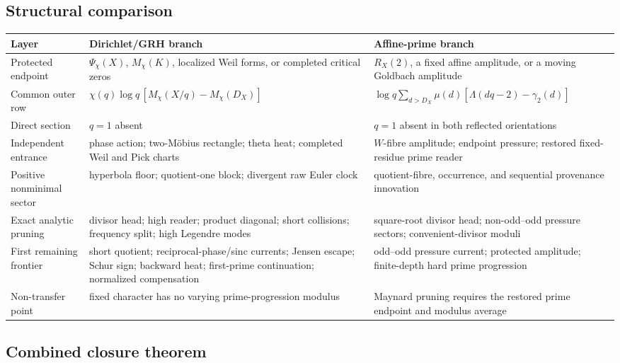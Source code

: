 \documentclass[11pt]{article}
\theoremstyle{definition}
\theoremstyle{remark}
\begin{document}
\subsection{Structural comparison}

\begin{center}
\small
\begin{tabularx}{\textwidth}{@{}L{0.19\textwidth}L{0.36\textwidth}L{0.36\textwidth}@{}}
\toprule
\textbf{Layer} & \textbf{Dirichlet/GRH branch} & \textbf{Affine-prime branch}\\
\midrule
Protected endpoint
& $\Psi_\chi(X)$, $M_\chi(K)$, localized Weil forms, or completed critical zeros
& $R_X(2)$, a fixed affine amplitude, or a moving Goldbach amplitude\\[0.35em]
Common outer row
& $\chi(q)\log q\,[M_\chi(X/q)-M_\chi(D_X)]$
& $\log q\sum_{d>D_X}\mu(d)[\Lambda(dq-2)-\gamma_2(d)]$\\[0.35em]
Direct section
& $q=1$ absent
& $q=1$ absent in both reflected orientations\\[0.35em]
Independent entrance
& phase action; two-M\"obius rectangle; theta heat; completed Weil and Pick charts
& $W$-fibre amplitude; endpoint pressure; restored fixed-residue prime reader\\[0.35em]
Positive nonminimal sector
& hyperbola floor; quotient-one block; divergent raw Euler clock
& quotient-fibre, occurrence, and sequential provenance innovation\\[0.35em]
Exact analytic pruning
& divisor head; high reader; product diagonal; short collisions; frequency split; high Legendre modes
& square-root divisor head; non-odd--odd pressure sectors; convenient-divisor moduli\\[0.35em]
First remaining frontier
& short quotient; reciprocal-phase/sinc currents; Jensen escape; Schur sign; backward heat; first-prime continuation; normalized compensation
& odd--odd pressure current; protected amplitude; finite-depth hard prime progression\\[0.35em]
Non-transfer point
& fixed character has no varying prime-progression modulus
& Maynard pruning requires the restored prime endpoint and modulus average\\
\bottomrule
\end{tabularx}
\end{center}

\subsection{Combined closure theorem}
\end{document}

